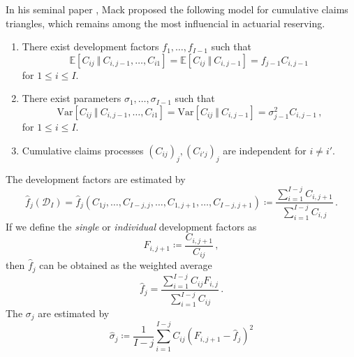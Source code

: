 \documentclass[a4paper]{book}
\begin{document}
In his seminal paper \cite{mack:chain-ladder}, Mack proposed the following model for cumulative claims triangles, which remains among the most influencial in actuarial reserving.
\begin{model} \label{model:mack} \leavevmode
  \begin{enumerate}[label=\bf{\textup{(}Mack\arabic*\textup{)}},ref=\textup{(}Mack\arabic*\textup{)}, wide]
    \item \label{assump:mack-expectation} There exist development factors $f_1, \dots, f_{I - 1}$ such that
          \begin{equation}
            \mathbb{E}[C_{ij} \ \Vert \ C_{i, j - 1}, \dots, C_{i1}] = \mathbb{E}[C_{ij} \ \Vert \ C_{i, j - 1}] = f_{j - 1} C_{i, j - 1}\,
          \end{equation}
          for $1 \leq i \leq I$.
    \item \label{assump:mack-variance} There exist parameters $\sigma_1, \dots, \sigma_{I - 1}$ such that
          \begin{equation}
            \mathrm{Var}[C_{ij} \ \Vert \ C_{i, j - 1}, \dots, C_{i1}] = \mathrm{Var}[C_{ij} \ \Vert \ C_{i, j - 1}] = \sigma_{j - 1}^2 C_{i, j - 1}\,,
          \end{equation}
          for $1 \leq i \leq I$.
    \item \label{assump:mack-independence} Cumulative claims processes $(C_{ij})_j, (C_{i'j})_j$ are independent for $i \neq i'$.
  \end{enumerate}
\end{model}
The development factors are estimated by
\begin{equation} \label{eq:devfac-estimator}
  \widehat{f}_j(\mathcal{D}_I) = \widehat{f}_j(C_{1j}, \dots, C_{I - j, j}, \dots, C_{1, j + 1}, \dots, C_{I - j, j + 1}) \coloneqq \frac{\sum_{i = 1}^{I - j} C_{i, j + 1}}{\sum_{i = 1}^{I - j} C_{i, j}} \,.
\end{equation}
If we define the \emph{single} or \emph{individual} development factors as
\begin{equation}
  F_{i, j + 1} \coloneqq \frac{C_{i, j + 1}}{C_{ij}} \,,
\end{equation}
then $\widehat{f}_j$ can be obtained as the weighted average
\begin{equation}
  \widehat{f}_j = \frac{\sum_{i = 1}^{I - j} C_{ij} F_{i, j}}{\sum_{i = 1}^{I - j} C_{ij}} \,.
\end{equation}
The $\sigma_j$ are estimated by
\begin{equation}
  \widehat{\sigma}_j \coloneqq \frac{1}{I-j}\sum_{i = 1}^{I-j} C_{ij}\left( F_{i, j + 1} - \widehat{f}_j \right)^2
\end{equation}
\end{document}
